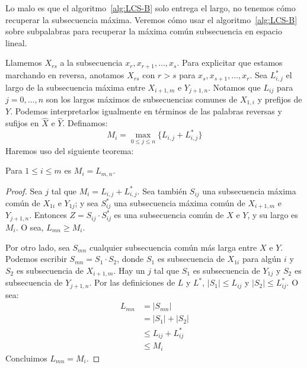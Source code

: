   Lo malo es que el algoritmo~\ref{alg:LCS-B} solo entrega el largo,
  no tenemos cómo recuperar la subsecuencia máxima.
  Veremos cómo usar el algoritmo~\ref{alg:LCS-B} sobre subpalabras
  para recuperar la máxima común subsecuencia en espacio lineal.

  Llamemos \(X_{r s}\) a la subsecuencia \(x_r, x_{r + 1}, \dotsc, x_s\).
  Para explicitar que estamos marchando en reversa,
  anotamos \(\widehat{X}_{r s}\) con \(r > s\)
  para \(x_s, x_{s + 1}, \dotsc, x_r\).
  Sea \(L^*_{i, j}\) el largo de la subsecuencia máxima
  entre \(X_{i + 1, m}\) e \(Y_{j + 1, n}\).
  Notamos que \(L_{i j}\) para \(j = 0, \dotsc, n\)
  son los largos máximos de subsecuencias comunes de \(X_{1, i}\)
  y prefijos de \(Y\).
  Podemos interpretarlos igualmente en términos de las palabras reversas
  y sufijos en \(\widehat{X}\) e \(\widehat{Y}\).
  Definamos:
  \begin{equation}
    \label{eq:LCS-M}
    M_i
      = \max_{0 \le j \le n} \{ L_{i, j} + L^*_{i, j} \}
  \end{equation}
  Haremos uso del siguiente teorema:
  \begin{theorem}
    \label{theo:LCS}
    Para \(1 \le i \le m\) es \(M_i = L_{m, n}\).
  \end{theorem}
  \begin{proof}
    Sea \(j\) tal que \(M_i = L_{i, j} + L^*_{i, j}\).
    Sea también \(S_{i j}\) una subsecuencia máxima común
    de \(X_{1 i}\) e \(Y_{1 j}\);
    y sea \(S^*_{i j}\) una subsecuencia máxima común
    de \(X_{i + 1, m}\) e \(Y_{j + 1, n}\).
    Entonces \(Z = S_{i j} \cdot S^*_{i j}\)
    es una subsecuencia común de \(X\) e \(Y\),
    y su largo es \(M_i\).
    O sea,
    \(L_{m n} \ge M_i\).

    Por otro lado,
    sea \(S_{m n}\) cualquier subsecuencia común más larga
    entre \(X\) e \(Y\).
    Podemos escribir \(S_{m n} = S_1 \cdot S_2\),
    donde \(S_1\) es subsecuencia de \(X_{1 i}\) para algún \(i\)
    y \(S_2\) es subsecuencia de \(X_{i + 1, m}\).
    Hay un \(j\) tal que \(S_1\) es subsecuencia de \(Y_{1 j}\)
    y \(S_2\) es subsecuencia de \(Y_{j + 1, n}\).
    Por las definiciones de \(L\) y \(L^*\),
    \(\lvert S_1 \rvert \le L_{i j}\)
    y \(\lvert S_2 \rvert \le L^*_{i j}\).
    O sea:
    \begin{align*}
      L_{m n}
        &=   \lvert S_{m n} \rvert \\
        &=   \lvert S_1 \rvert + \lvert S_2 \rvert \\
        &\le L_{i j} + L^*_{i j} \\
        &\le M_i
    \end{align*}
    Concluimos \(L_{m n} = M_i\).
  \end{proof}

